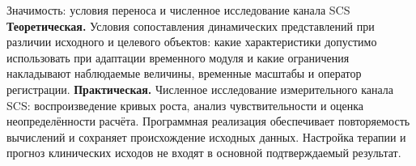 \begin{frame}{Значимость: условия переноса и численное исследование канала SCS}
\textbf{Теоретическая.} Условия сопоставления динамических представлений при различии исходного и целевого объектов: какие характеристики допустимо использовать при адаптации временного модуля и какие ограничения накладывают наблюдаемые величины, временные масштабы и оператор регистрации.
\SlideGap
\textbf{Практическая.} Численное исследование измерительного канала SCS: воспроизведение кривых роста, анализ чувствительности и оценка неопределённости расчёта. Программная реализация обеспечивает повторяемость вычислений и сохраняет происхождение исходных данных.
\SlideGap
Настройка терапии и прогноз клинических исходов не входят в основной подтверждаемый результат.
\end{frame}
